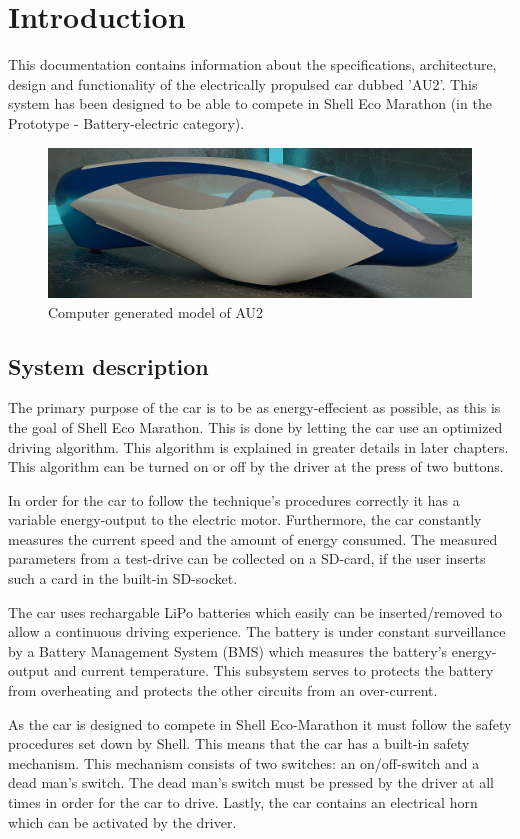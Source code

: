 \chapter{Introduction}
This documentation contains information about the specifications, architecture, design and functionality of the electrically propulsed car dubbed 'AU2'. This system has been designed to be able to compete in Shell Eco Marathon (in the Prototype - Battery-electric category).

\begin{figure}[H]
	\centering
	\includegraphics[width=0.6\linewidth]{Introduction/Model}
	\caption{Computer generated model of AU2}
	\label{fig:System_model}
\end{figure}

\section{System description}
The primary purpose of the car is to be as energy-effecient as possible, as this is the goal of Shell Eco Marathon. This is done by letting the car use an optimized driving algorithm. This algorithm is explained in greater details in later chapters. This algorithm can be turned on or off by the driver at the press of two buttons.

In order for the car to follow the technique's procedures correctly it has a variable energy-output to the electric motor. Furthermore, the car constantly measures the current speed and the amount of energy consumed. The measured parameters from a test-drive can be collected on a SD-card, if the user inserts such a card in the built-in SD-socket.

The car uses rechargable LiPo batteries which easily can be inserted/removed to allow a continuous driving experience. The battery is under constant surveillance by a Battery Management System (BMS) which measures the battery's energy-output and current temperature. This subsystem serves to protects the battery from overheating and protects the other circuits from an over-current.

As the car is designed to compete in Shell Eco-Marathon it must follow the safety procedures set down by Shell. This means that the car has a built-in safety mechanism. This mechanism consists of two switches: an on/off-switch and a dead man's switch. The dead man's switch must be pressed by the driver at all times in order for the car to drive. Lastly, the car contains an electrical horn which can be activated by the driver.

